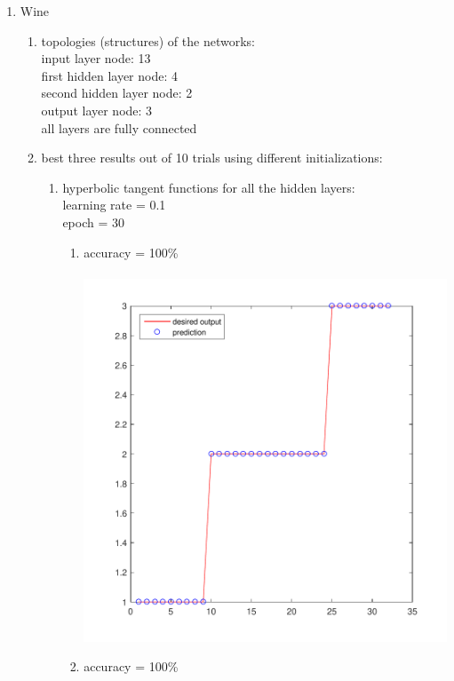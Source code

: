 \documentclass[12pt,a4paper]{article}
\begin{document}
\begin{CJK}{UTF8}{bsmi}
\begin{enumerate}
\begin{enumerate}
	\end{enumerate}
\newpage
\item Wine
\begin{enumerate}
	\item topologies (structures) of the networks: \\
	input layer node: 13 \\
	first hidden layer node: 4 \\
	second hidden layer node: 2 \\
	output layer node: 3\\
	all layers are fully connected
	\item best three results out of 10 trials using different initializations:
	\begin{enumerate}
		\item hyperbolic tangent functions for all the hidden layers:
		\\
		learning rate = 0.1 \\
		epoch = 30
		\begin{enumerate}
			\item accuracy = 100\%\\\
			\includegraphics[scale=0.6]{winehh1}
			\newpage	
			\item accuracy = 100\%\\\

\end{enumerate}
\end{enumerate}
\end{enumerate}
\end{enumerate}
\end{CJK}
\end{document}

